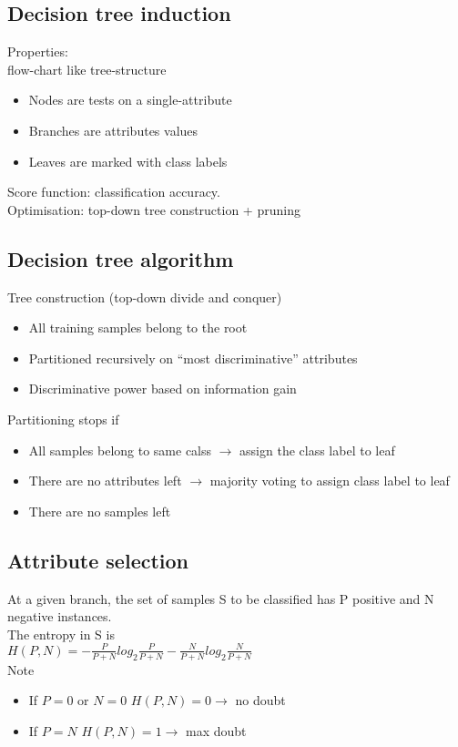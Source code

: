 \subsection{Decision tree induction}
Properties: \\
flow-chart like tree-structure
\begin{itemize}
\item Nodes are tests on a single-attribute
\item Branches are attributes values
\item Leaves are marked with class labels
\end{itemize}
Score function: classification accuracy. \\
Optimisation: top-down tree construction + pruning

\subsection{Decision tree algorithm}
Tree construction (top-down divide and conquer)
\begin{itemize}
\item All training samples belong to the root
\item Partitioned recursively on ``most discriminative'' attributes
\item Discriminative power based on information gain
\end{itemize}
Partitioning stops if
\begin{itemize}
\item All samples belong to same calss $ \rightarrow $ assign the
  class label to leaf
\item There are no attributes left $ \rightarrow $ majority voting to
  assign class label to leaf
\item There are no samples left
\end{itemize}

\subsection{Attribute selection}
At a given branch, the set of samples S to be classified has P
positive and N negative instances. \\
The entropy in S is \\
$ H(P, N) = - \frac{P}{P + N} log_2 \frac{P}{P + N} - \frac{N}{P + N}
log_2 \frac{N}{P + N} $ \\
Note
\begin{itemize}
\item If $ P = 0 $ or $ N = 0 $ \quad $ H(P, N) = 0 \rightarrow $ no
  doubt
\item If $ P = N $ \quad $ H(P, N) = 1 \rightarrow $ max doubt
\end{itemize}

